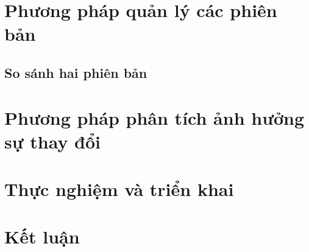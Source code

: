 \documentclass[12pt,a4paper]{report}
\begin{document}
\chapter{Phương pháp quản lý các phiên bản}
\section{So sánh hai phiên bản}
\chapter{Phương pháp phân tích ảnh hưởng sự thay đổi}


\chapter{Thực nghiệm và triển khai}
\chapter{Kết luận}
\end{document}
